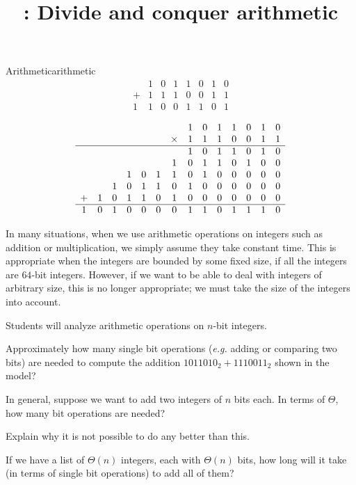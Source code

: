 \documentclass{tufte-handout}
\title{\thecourse: Divide and conquer arithmetic}
\date{}
\begin{document}
\maketitle


\begin{model*}{Arithmetic}{arithmetic}
  \[
    \begin{array}{cccccccc}
         & 1 & 0 & 1 & 1 & 0 & 1 & 0 \\
       + & 1 & 1 & 1 & 0 & 0 & 1 & 1 \\
      \hline
       1 & 1 & 0 & 0 & 1 & 1 & 0 & 1
    \end{array}
  \] \vspace{0.3in}

  \[
    \begin{array}{cccccccccccccc}
  & & & & & & &1&0&1&1&0&1&0 \\
  & & & & & &\times&1&1&1&0&0&1&1 \\
  \hline
  & & & & & & &1&0&1&1&0&1&0 \\
  & & & & & &1&0&1&1&0&1&0&0 \\
  & & &1&0&1&1&0&1&0&0&0&0&0 \\
  & &1&0&1&1&0&1&0&0&0&0&0&0 \\
 +&1&0&1&1&0&1&0&0&0&0&0&0&0 \\
 \hline
 1&0&1&0&0&0&0&1&1&0&1&1&1&0
    \end{array}
  \] \vspace{0.3in}
\end{model*}

In many situations, when we use arithmetic operations on integers such
as addition or multiplication, we simply assume they take constant
time.  This is appropriate when the integers are bounded by some fixed
size, \eg if all the integers are $64$-bit integers.  However, if we
want to be able to deal with integers of arbitrary size, this is no
longer appropriate; we must take the size of the integers into account.

\begin{objective}
  Students will analyze arithmetic operations on $n$-bit integers.
\end{objective}

\begin{questions}
\item Approximately how many single bit operations (\emph{e.g.} adding
  or comparing two bits) are needed to compute the addition
  $1011010_2 + 1110011_2$ shown in the model?
\item In general, suppose we want to add two integers of $n$ bits
  each.  In terms of $\Theta$, how many bit operations are needed?
\item Explain why it is not possible to do any better than this.
\item If we have a list of $\Theta(n)$ integers, each with
  $\Theta(n)$ bits, how long will it take (in terms of single bit
  operations) to add all of them?
\end{questions}
\end{document}
